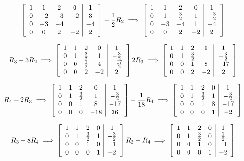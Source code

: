 \documentclass[a4paper, 12pt]{report}
\begin{document}
{     \[
     \left[ \begin{array}{c c c c| c}
     1& 1& 2& 0& 1\\
     0& -2& -3&-2& 3\\
     0& -3& -4& 1& -4\\
     0& 0& 2& -2& 2
     \end{array} \right]
     -\frac{1}{2}R_2 \implies
     \left[ \begin{array}{c c c c| c}
     1& 1& 2& 0& 1\\
     0& 1& \frac{3}{2}& 1& -\frac{3}{2}\\
     0& -3& -4& 1& -4\\
     0& 0& 2& -2& 2
     \end{array} \right]
     \]
     
     \[
     R_3+3R_2 \implies
     \left[ \begin{array}{c c c c| c}
     1& 1& 2& 0& 1\\
     0& 1& \frac{3}{2}& 1& -\frac{3}{2}\\
     0& 0& \frac{1}{2}& 4& -\frac{17}{2}\\
     0& 0& 2& -2& 2
     \end{array} \right]
     2R_3 \implies
     \left[ \begin{array}{c c c c| c}
     1& 1& 2& 0& 1\\
     0& 1& \frac{3}{2}& 1& -\frac{3}{2}\\
     0& 0& 1& 8& -17\\
     0& 0& 2& -2& 2
     \end{array} \right]
     \]
     
     \[
     R_4-2R_3 \implies
     \left[ \begin{array}{c c c c| c}
     1& 1& 2& 0& 1\\
     0& 1& \frac{3}{2}& 1& -\frac{3}{2}\\
     0& 0& 1& 8& -17\\
     0& 0& 0& -18& 36
     \end{array} \right]
     -\frac{1}{18}R_4 \implies
     \left[ \begin{array}{c c c c| c}
     1& 1& 2& 0& 1\\
     0& 1& \frac{3}{2}& 1& -\frac{3}{2}\\
     0& 0& 1& 8& -17\\
     0& 0& 0& 1& -2
     \end{array} \right]
     \]
     
     \[
     R_3-8R_4 \implies
     \left[ \begin{array}{c c c c| c}
     1& 1& 2& 0& 1\\
     0& 1& \frac{3}{2}& 1& -\frac{3}{2}\\
     0& 0& 1& 0& -1\\
     0& 0& 0& 1& -2
     \end{array} \right]
     R_2-R_4 \implies
     \left[ \begin{array}{c c c c| c}
     1& 1& 2& 0& 1\\
     0& 1& \frac{3}{2}& 0& \frac{1}{2}\\
     0& 0& 1& 0& -1\\
     0& 0& 0& 1& -2
     \end{array} \right]
     \]
     
}
\end{document}

